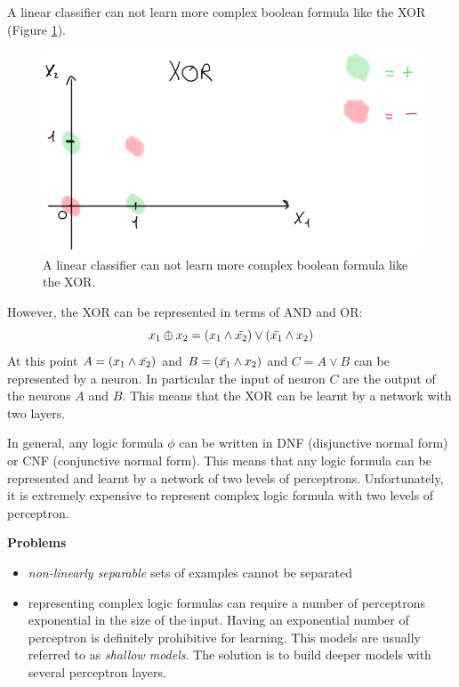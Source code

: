 A linear classifier can not learn more complex boolean formula like the XOR (Figure
\ref{fig:xorPerceptron}).
\newline

\begin{figure}[H]
	\centering
	\includegraphics[scale=0.5]{
		images/12_LinearDiscriminantFunctions_xorPerceptron.png
	}
	\caption{A linear classifier can not learn more complex boolean formula like
	the XOR.}
	\label{fig:xorPerceptron}
\end{figure}

However, the XOR can be represented in terms of AND and OR:
\[
	x_{1}\oplus x_{2}= (x_{1}\wedge \Bar{x_2}) \vee (\Bar{x_1}\wedge x_{2})
\]
At this point $A=(x_{1}\wedge \Bar{x_2})$ and $B=(\Bar{x_1}\wedge x_{2})$ and
$C = A \vee B$ can be represented by a neuron. In particular the input of neuron
$C$ are the output of the neurons $A$ and $B$. This means that the XOR can be
learnt by a network with two layers.
\newline

In general, any logic formula $\phi$ can be written in DNF (disjunctive normal
form) or CNF (conjunctive normal form). This means that any logic formula can be
represented and learnt by a network of two levels of perceptrons. Unfortunately,
it is extremely expensive to represent complex logic formula with two levels of
perceptron.
\newline

\textbf{Problems}
\begin{itemize}
	\item \textit{non-linearly separable} sets of examples cannot be separated

	\item representing complex logic formulas can require a number of perceptrons exponential
		in the size of the input. Having an exponential number of perceptron is
		definitely prohibitive for learning. This models are usually referred to as \textit{shallow
		models}. The solution is to build deeper models with several perceptron layers.
\end{itemize}

